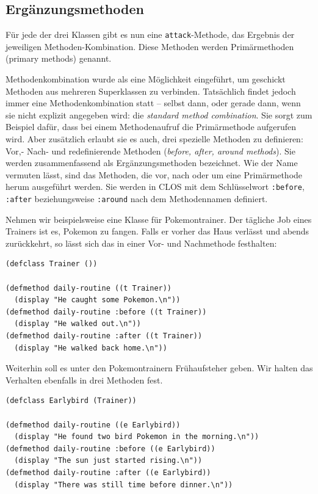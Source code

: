 \subsection{Ergänzungsmethoden}
\label{ergmeth}
Für jede der drei Klassen gibt es nun eine \texttt{attack}-Methode, das Ergebnis der jeweiligen Methoden-Kombination. Diese Methoden werden Primärmethoden (primary methods) genannt.

Methodenkombination wurde als eine Möglichkeit eingeführt, um geschickt Methoden aus mehreren Superklassen zu verbinden. Tatsächlich findet jedoch immer eine Methodenkombination statt -- selbst dann, oder gerade dann, wenn sie nicht explizit angegeben wird: die \textit{standard method combination}. Sie sorgt zum Beispiel dafür, dass bei einem Methodenaufruf die Primärmethode aufgerufen wird. Aber zusätzlich erlaubt sie es auch, drei spezielle Methoden zu definieren: Vor,- Nach- und redefinierende Methoden (\emph{before, after, around methods}). Sie werden zusammenfassend als Ergänzungsmethoden  bezeichnet. Wie der Name vermuten lässt, sind das Methoden, die vor, nach oder um eine Primärmethode herum ausgeführt werden. Sie werden in CLOS mit dem Schlüsselwort \texttt{:before}, \texttt{:after} beziehungsweise \texttt{:around} nach dem Methodennamen definiert.

Nehmen wir beispielsweise eine Klasse für Pokemontrainer. Der tägliche Job eines Trainers ist es, Pokemon zu fangen. Falls er vorher das Haus verlässt und abends zurückkehrt, so lässt sich das in einer Vor- und Nachmethode festhalten:

\begin{lstlisting}
(defclass Trainer ())

(defmethod daily-routine ((t Trainer))
  (display "He caught some Pokemon.\n"))
(defmethod daily-routine :before ((t Trainer))
  (display "He walked out.\n"))
(defmethod daily-routine :after ((t Trainer))
  (display "He walked back home.\n"))
\end{lstlisting}

Weiterhin soll es unter den Pokemontrainern Frühaufsteher geben. Wir halten das Verhalten ebenfalls in drei Methoden fest.

\begin{lstlisting}
(defclass Earlybird (Trainer))

(defmethod daily-routine ((e Earlybird))
  (display "He found two bird Pokemon in the morning.\n"))
(defmethod daily-routine :before ((e Earlybird))
  (display "The sun just started rising.\n"))
(defmethod daily-routine :after ((e Earlybird))
  (display "There was still time before dinner.\n"))
\end{lstlisting}

